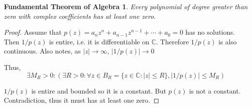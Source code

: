 \documentclass{article}
\newtheorem*{thm}{Fundamental Theorem of Algebra}
\theoremstyle{definition}\newtheorem{definition}{Definition}
\begin{document}
\begin{thm}
	
	Every polynomial of degree greater than zero with complex coefficients has at least one zero.
\end{thm}	

\begin{proof}
	Assume that $p(z)=a_nz^n+a_{n-1}z^{n-1}+\cdots+a_0=0$ has no solutions. Then $1/p(z)$ is entire, i.e. it is differentiable on $\mathbb{C}$. Therefore $1/p(z)$ is also continuous. Also notes, as $|z| \rightarrow \infty$, $|1/p(z)| \rightarrow 0$
	
	Thus, $$\exists M_R>0 :(  \exists R>0:\forall z \in B_R=\{z\in \mathbb{C}: |z|\leq R\}, |1/p(z)| \leq M_R)$$
	

	$1/p(z)$ is entire and bounded so it is a constant. But $p(z)$ is not a constant. Contradiction, thus it must has at least one zero.
\end{proof}			
			
\end{document}
